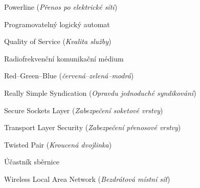 \begin{acronym}[KolikMista]
	{Powerline (\textit{Přenos po elektrické síti})}

	{Programovatelný logický automat}

	{Quality of Service (\textit{Kvalita služby})}

	{Radiofrekvenční komunikační médium}

	{Red–Green–Blue (\textit{červená–zelená–modrá})}

	{Really Simple Syndication (\textit{Opravdu jednoduché syndikování})}

	{Secure Sockets Layer (\textit{Zabezpečení soketové vrstvy})}

	{Transport Layer Security (\textit{Zabezpečení přenosové vrstvy})}

	{Twisted Pair (\textit{Kroucená dvojlinka})}

	{Účastník sběrnice}

	{Wireless Local Area Network (\textit{Bezdrátová místní síť})}
\end{acronym}

